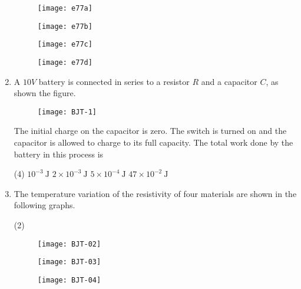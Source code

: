 \begin{enumerate}
\begin{tasks}
		\task[\textbf{A.}] \begin{figure}[H]
			\centering
			\texttt{[image: e77a]}
		\end{figure}
		\task[\textbf{B.}] \begin{figure}[H]
			\centering
			\texttt{[image: e77b]}
		\end{figure}
		\task[\textbf{C.}] \begin{figure}[H]
			\centering
			\texttt{[image: e77c]}
		\end{figure}
		\task[\textbf{D.}] \begin{figure}[H]
			\centering
			\texttt{[image: e77d]}
		\end{figure}
	\end{tasks}
	\item A $10 V$ battery is connected in series to a resistor $R$ and a capacitor $C$, as shown the figure.\\\begin{figure}[H]
		\centering
		\texttt{[image: BJT-1]}
	\end{figure}
	The initial charge on the capacitor is zero. The switch is turned on and the capacitor is allowed to charge to its full capacity. The total work done by the battery in this process is
	{}
	\begin{tasks}(4)
		\task[\textbf{A.}] $10^{-3} \mathrm{~J}$
		\task[\textbf{B.}] $2 \times 10^{-3} \mathrm{~J}$
		\task[\textbf{C.}] $5 \times 10^{-4} \mathrm{~J}$
		\task[\textbf{D.}] $47 \times 10^{-2} \mathrm{~J}$
	\end{tasks}
	\item The temperature variation of the resistivity of four materials are shown in the following graphs.
	\begin{tasks}(2)
		\task[\textbf{A.}] \begin{figure}[H]
			\centering
			\texttt{[image: BJT-02]}
		\end{figure}
		\task[\textbf{B.}]\begin{figure}[H]
			\centering
			\texttt{[image: BJT-03]}
		\end{figure}
		\task[\textbf{C.}] \begin{figure}[H]
			\centering
			\texttt{[image: BJT-04]}
		\end{figure}
		\task[\textbf{D.}] \begin{figure}[H]

\end{figure}
\end{tasks}
\end{enumerate}
